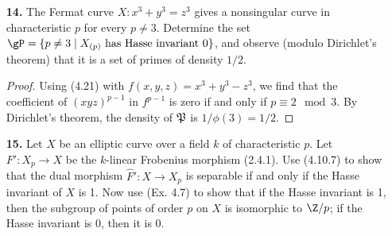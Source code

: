 \documentclass[a4paper]{article}
\begin{document}
\begin{enumerate} [label=\textbf{\arabic*.}, leftmargin=0em]
          \begin{proof}
              The polynomial $h_p(\lambda)$ of (4.22) for $p = 13$ is
              \begin{align*}
                  h_{13}(\lambda) = \lambda^6 + 10\lambda^5 + 4\lambda^4 + 10\lambda^3 + 4\lambda^2 + 10\lambda + 1,
              \end{align*}
              and an elliptic curve has Hasse invariant 0 if and only if $h_{13}(\lambda) = 0$.
              On the otherhand, consider the $j$-invariant
              \begin{equation*}
                  j = 2^8 \frac{(\lambda^2 - \lambda + 1)^3}{\lambda^2(\lambda - 1)^2}.
              \end{equation*}
              Expanding above modulo 13 gives
              \begin{equation*}
                  \lambda^6 + 10\lambda^5 + (10j + 6)\lambda^4 + (6j + 6)\lambda^3 + (10j + 6)\lambda^2 + 10\lambda + 1 = 0.
              \end{equation*}
              Matching coefficients with $h_{13}(\lambda)$ and solving for $j$ gives $j \equiv 5 \mod{13}$.
          \end{proof}

    \item[\textbf{14.}] The Fermat curve $X : x^3 + y^3 = z^3$ gives a nonsingular curve in characteristic $p$ for every $p \neq 3$.
          Determine the set $\gP = \{p \neq 3 \mid \text{$X_{(p)}$ has Hasse invariant 0} \}$, and observe (modulo Dirichlet's theorem) that it is a set of primes of density $1 / 2$.

          \begin{proof}
              Using (4.21) with $f(x, y, z) = x^3 + y^3 - z^3$, we find that the coefficient of $(xyz)^{p - 1}$ in $f^{p - 1}$ is zero if and only if $p \equiv 2 \mod{3}$.
              By Dirichlet's theorem, the density of $\mathfrak{P}$ is $1 / \phi(3) = 1 / 2$.
          \end{proof}

    \item[\textbf{15.}] Let $X$ be an elliptic curve over a field $k$ of characteristic $p$.
          Let $F' : X_p \to X$ be the $k$-linear Frobenius morphism (2.4.1).
          Use (4.10.7) to show that the dual morphism $\hat{F}' : X \to X_p$ is separable if and only if the Hasse invariant of $X$ is 1.
          Now use (Ex. 4.7) to show that if the Hasse invariant is 1, then the subgroup of points of order $p$ on $X$ is isomorphic to $\Z / p$; if the Hasse invariant is 0, then it is 0.


\end{enumerate}
\end{document}
